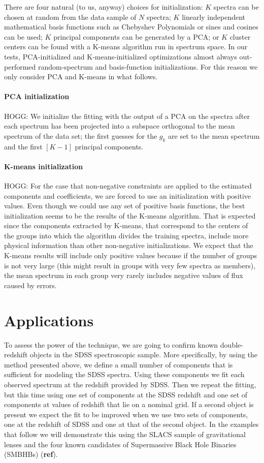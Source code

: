 \documentclass[12pt,preprint]{aastex}
\begin{document}
There are four natural (to us, anyway) choices for initialization: $K$
spectra can be chosen at random from the data sample of $N$ spectra;
$K$ linearly independent mathematical basis functions such as
Chebyshev Polynomials or sines and cosines can be used; $K$ principal
components can be generated by a PCA; or $K$ cluster centers can be
found with a K-means algorithm run in spectrum space.  In our tests,
PCA-initialized and K-means-initialized optimizations almost always
out-performed random-spectrum and basis-function initializations.  For
this reason we only consider PCA and K-means in what follows.

\paragraph{PCA initialization}
HOGG: We initialize the fitting with the output of a PCA on the
spectra after each spectrum has been projected into a subspace
orthogonal to the mean spectrum of the data set; the first guesses for
the $g_{k}$ are set to the mean spectrum and the first $[K-1]$
principal components.

\paragraph{K-means initialization}
HOGG: For the case that non-negative constraints are applied to the
estimated components and coefficients, we are forced to use an
initialization with positive values. Even though we could use any set
of positive basis functions, the best initialization seems to be the
results of the K-means algorithm. That is expected since the
components extracted by K-means, that correspond to the centers of the
groups into which the algorithm divides the training spectra, include
more physical information than other non-negative initializations. We
expect that the K-means results will include only positive values
because if the number of groups is not very large (this might result
in groups with very few spectra as members), the mean spectrum in each
group very rarely includes negative values of flux caused by errors.

\section{Applications}\label{sec:applications}
To assess the power of the technique, we are going to confirm known
double-redshift objects in the SDSS spectroscopic sample. More
specifically, by using the method presented above, we define a small
number of components that is sufficient for modeling the SDSS
spectra. Using these components we fit each observed spectrum at the
redshift provided by SDSS. Then we repeat the fitting, but this time
using one set of components at the SDSS redshift and one set of
components at values of redshift that lie on a nominal grid. If a
second object is present we expect the fit to be improved when we use
two sets of components, one at the redshift of SDSS and one at that of
the second object. In the examples that follow we will demonstrate
this using the SLACS sample of gravitational lenses \citep{bolton} and
the four known candidates of Supermassive Black Hole Binaries (SMBHBs)
(\textbf{ref}).
\end{document}
